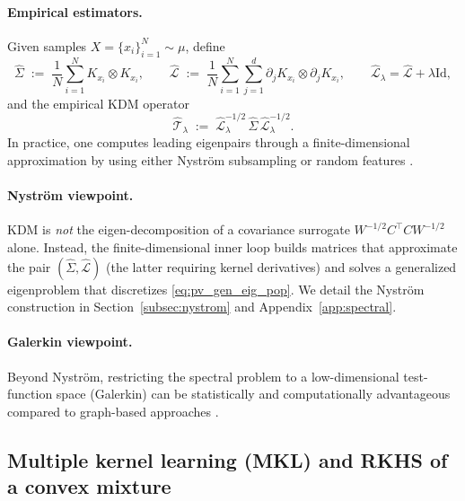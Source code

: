 \documentclass[11pt]{article}
\theoremstyle{remark}
\newcommand{\Id}{\mathrm{Id}}
\begin{document}
\paragraph{Empirical estimators.}
Given samples $X=\{x_i\}_{i=1}^N\sim\mu$, define
\begin{equation}
\widehat{\Sigma}
\;:=\;
\frac1N\sum_{i=1}^N K_{x_i}\otimes K_{x_i},
\qquad
\widehat{\mathcal{L}}
\;:=\;
\frac1N\sum_{i=1}^N\sum_{j=1}^d \partial_j K_{x_i}\otimes \partial_j K_{x_i},
\qquad
\widehat{\mathcal{L}}_\lambda=\widehat{\mathcal{L}}+\lambda \Id,
\label{eq:pv_emp_ops}
\end{equation}
and the empirical KDM operator
\begin{equation}
\widehat{\mathcal{T}}_\lambda
\;:=\;
\widehat{\mathcal{L}}_\lambda^{-1/2}\,\widehat{\Sigma}\,\widehat{\mathcal{L}}_\lambda^{-1/2}.
\label{eq:pv_emp_T}
\end{equation}
In practice, one computes leading eigenpairs through a finite-dimensional approximation by using either Nystr\"om subsampling or random features \citep{pmlr-v195-pillaud-vivien23a}.

\paragraph{Nystr\"om viewpoint.}
KDM  is \emph{not} the eigen-decomposition of a covariance surrogate $W^{-1/2}C^\top C W^{-1/2}$ alone.
Instead, the finite-dimensional inner loop builds matrices that approximate the pair $(\widehat{\Sigma},\widehat{\mathcal{L}})$ (the latter requiring kernel derivatives) and solves a generalized eigenproblem that discretizes \eqref{eq:pv_gen_eig_pop}.
We detail the Nystr\"om construction in Section~\ref{subsec:nystrom} and Appendix~\ref{app:spectral}.

\paragraph{Galerkin viewpoint.}
Beyond Nystr\"om, restricting the spectral problem to a low-dimensional test-function space (Galerkin) can be statistically and computationally advantageous compared to graph-based approaches \citep{pmlr-v238-cabannes24a}.

\subsection{Multiple kernel learning (MKL) and RKHS of a convex mixture}
\label{subsec:mkl}
\end{document}
